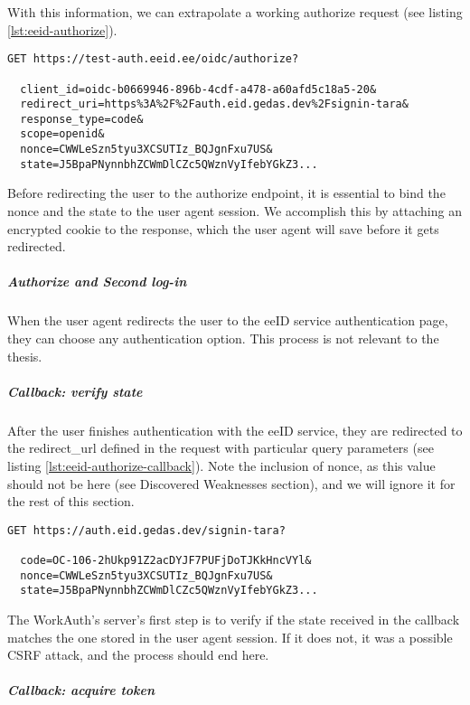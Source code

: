 With this information, we can extrapolate a working {authorize} request (see listing \ref{lst:eeid-authorize}).

\begin{lstlisting}[caption={The eeID service authorize endpoint request}, label={lst:eeid-authorize}]
  GET https://test-auth.eeid.ee/oidc/authorize?

  client_id=oidc-b0669946-896b-4cdf-a478-a60afd5c18a5-20&
  redirect_uri=https%3A%2F%2Fauth.eid.gedas.dev%2Fsignin-tara&
  response_type=code&
  scope=openid&
  nonce=CWWLeSzn5tyu3XCSUTIz_BQJgnFxu7US&
  state=J5BpaPNynnbhZCWmDlCZc5QWznVyIfebYGkZ3...
\end{lstlisting}

Before redirecting the user to the {authorize} endpoint, it is essential to bind the nonce and the state to the user agent session. We accomplish this by attaching an encrypted cookie to the response, which the user agent will save before it gets redirected.

\subparagraph{Authorize and Second log-in}

When the user agent redirects the user to the eeID service authentication page, they can choose any authentication option. This process is not relevant to the thesis.

\subparagraph{Callback: verify state}

After the user finishes authentication with the eeID service, they are redirected to the redirect\_url defined in the request with particular query parameters (see listing \ref{lst:eeid-authorize-callback}). Note the inclusion of nonce, as this value should not be here \cite{okta-oidc-spec} (see Discovered Weaknesses section), and we will ignore it for the rest of this section.

\begin{lstlisting}[caption={The eeID service authorize redirect response}, label={lst:eeid-authorize-callback}]
  GET https://auth.eid.gedas.dev/signin-tara?
  
  code=OC-106-2hUkp91Z2acDYJF7PUFjDoTJKkHncVYl&
  nonce=CWWLeSzn5tyu3XCSUTIz_BQJgnFxu7US&
  state=J5BpaPNynnbhZCWmDlCZc5QWznVyIfebYGkZ3...
\end{lstlisting}

The WorkAuth's server's first step is to verify if the state received in the callback matches the one stored in the user agent session. If it does not, it was a possible CSRF attack, and the process should end here.

\subparagraph{Callback: acquire token}

